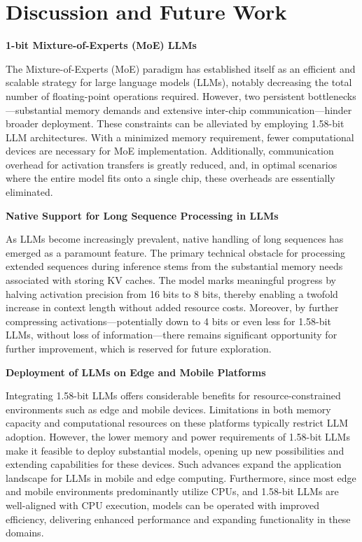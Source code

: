 \section{Discussion and Future Work}

\textbf{1-bit Mixture-of-Experts (MoE) LLMs}

The Mixture-of-Experts (MoE) paradigm has established itself as an efficient and scalable strategy for large language models (LLMs), notably decreasing the total number of floating-point operations required. However, two persistent bottlenecks—substantial memory demands and extensive inter-chip communication—hinder broader deployment. These constraints can be alleviated by employing 1.58-bit LLM architectures. With a minimized memory requirement, fewer computational devices are necessary for MoE implementation. Additionally, communication overhead for activation transfers is greatly reduced, and, in optimal scenarios where the entire model fits onto a single chip, these overheads are essentially eliminated.

\textbf{Native Support for Long Sequence Processing in LLMs}

As LLMs become increasingly prevalent, native handling of long sequences has emerged as a paramount feature. The primary technical obstacle for processing extended sequences during inference stems from the substantial memory needs associated with storing KV caches. The  model marks meaningful progress by halving activation precision from 16 bits to 8 bits, thereby enabling a twofold increase in context length without added resource costs. Moreover, by further compressing activations—potentially down to 4 bits or even less for 1.58-bit LLMs, without loss of information—there remains significant opportunity for further improvement, which is reserved for future exploration.

\textbf{Deployment of LLMs on Edge and Mobile Platforms}

Integrating 1.58-bit LLMs offers considerable benefits for resource-constrained environments such as edge and mobile devices. Limitations in both memory capacity and computational resources on these platforms typically restrict LLM adoption. However, the lower memory and power requirements of 1.58-bit LLMs make it feasible to deploy substantial models, opening up new possibilities and extending capabilities for these devices. Such advances expand the application landscape for LLMs in mobile and edge computing. Furthermore, since most edge and mobile environments predominantly utilize CPUs, and 1.58-bit LLMs are well-aligned with CPU execution,  models can be operated with improved efficiency, delivering enhanced performance and expanding functionality in these domains.

